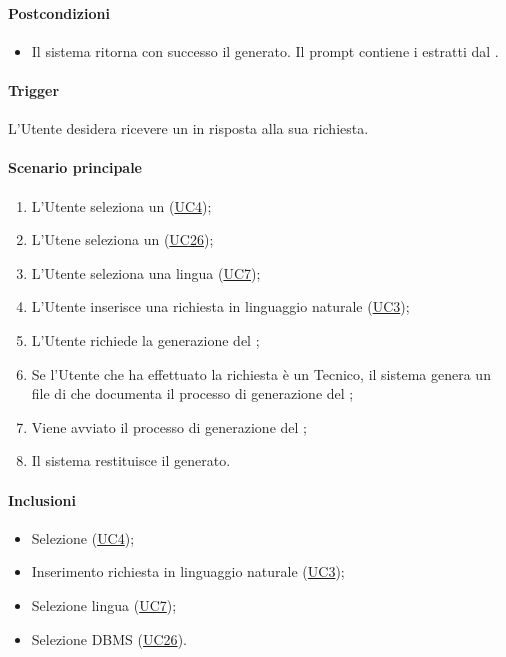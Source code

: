 \paragraph*{Postcondizioni}
\begin{itemize}
  \item Il sistema ritorna con successo il  generato. Il prompt contiene i  estratti dal .
\end{itemize}

\paragraph*{Trigger}
L'Utente desidera ricevere un  in risposta alla sua richiesta.

\paragraph*{Scenario principale}
\begin{enumerate}
  \item L'Utente seleziona un (\hyperref[UC4]{UC4});
  \item L'Utene seleziona un  (\hyperref[UC26]{UC26});
  \item L'Utente seleziona una lingua (\hyperref[UC7]{UC7});
  \item L'Utente inserisce una richiesta in linguaggio naturale (\hyperref[UC3]{UC3});
  \item L'Utente richiede la generazione del ;
  \item Se l'Utente che ha effettuato la richiesta è un Tecnico, il sistema genera un file di  che documenta il processo di generazione del ;
  \item Viene avviato il processo di generazione del ;
  \item Il sistema restituisce il  generato.
\end{enumerate}

\paragraph*{Inclusioni}
\begin{itemize}
  \item Selezione  (\hyperref[UC4]{UC4});
  \item Inserimento richiesta in linguaggio naturale (\hyperref[UC3]{UC3});
  \item Selezione lingua (\hyperref[UC7]{UC7});
  \item Selezione DBMS (\hyperref[UC26]{UC26}).
\end{itemize}


